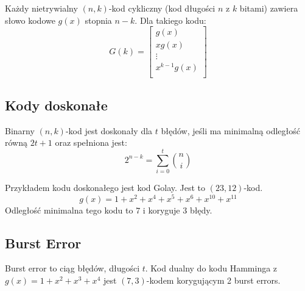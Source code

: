 \documentclass{../notatki}
\begin{document}
Każdy nietrywialny $(n, k)$-kod cykliczny (kod długości $n$ z $k$ bitami)
zawiera słowo kodowe $g(x)$ stopnia $n - k$. Dla takiego kodu:
$$
G(k) =
\begin{bmatrix}
g(x) \\
xg(x) \\
\vdots \\
x^{k - 1}g(x) \\
\end{bmatrix}
$$

\subsection{Kody doskonałe}

Binarny $(n, k)$-kod jest doskonały dla $t$ błędów, jeśli ma minimalną odległość
równą $2t + 1$ oraz spełniona jest:
$$
2^{n - k} = \sum_{i = 0}^{t} \binom{n}{i}
$$

Przykładem kodu doskonałego jest kod Golay. Jest to $(23, 12)$-kod.
$$
g(x) = 1 + x^2 + x^4 + x^5 + x^6 + x^10 + x^11
$$
Odległość minimalna tego kodu to $7$ i koryguje $3$ błędy.

\subsection{Burst Error}

Burst error to ciąg błędów, długości $t$. Kod dualny do kodu Hamminga z
$g(x)=1 + x^2 + x^3 + x^4$ jest $(7,3)$-kodem korygującym 2 burst errors.
\end{document}
